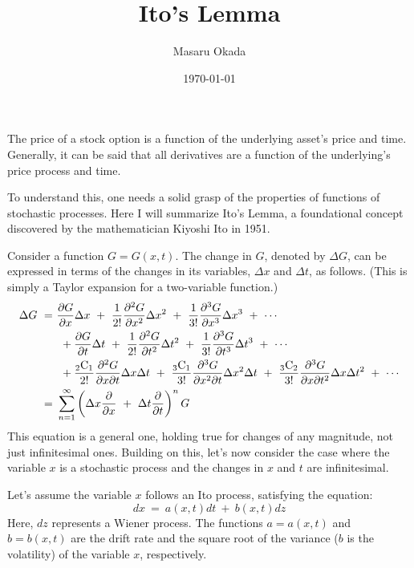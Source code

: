 \documentclass[uplatex,a4j,12pt,dvipdfmx]{jsarticle}
\title{Ito's Lemma}
\author{Masaru Okada}
\date{\today}
\begin{document}
\maketitle

The price of a stock option is a function of the underlying asset's price and time. Generally, it can be said that all derivatives are a function of the underlying's price process and time.

To understand this, one needs a solid grasp of the properties of functions of stochastic processes. Here I will summarize Ito's Lemma, a foundational concept discovered by the mathematician Kiyoshi Ito in 1951.

Consider a function $G=G(x,t)$. The change in $G$, denoted by $\Delta G$, can be expressed in terms of the changes in its variables, $\Delta x$ and $\Delta t$, as follows. (This is simply a Taylor expansion for a two-variable function.)
\begin{align}
	\Delta G
	\ = & \
	\dfrac{\partial G}{\partial x} \Delta x
	\ + \
	\dfrac{1}{2!} \dfrac{\partial^{2} G}{\partial x^{2}} \Delta x^{2}
	\ + \
	\dfrac{1}{3!} \dfrac{\partial^{3} G}{\partial x^{3}} \Delta x^{3}
	\ + \
	\cdots
	\\
	    & \ \ +
	\dfrac{\partial G}{\partial t} \Delta t
	\ + \
	\dfrac{1}{2!} \dfrac{\partial^{2} G}{\partial t^{2}} \Delta t^{2}
	\ + \
	\dfrac{1}{3!} \dfrac{\partial^{3} G}{\partial t^{3}} \Delta t^{3}
	\ + \
	\cdots
	\\
	    & \ \ +
	\dfrac{ {}_2 {\rm C}_{1} }{2!}
	\dfrac{\partial^{2} G}{\partial x \partial t } \Delta x \Delta t
	\ + \
	\dfrac{ {}_3 {\rm C}_{1} }{3!}
	\dfrac{\partial^{3} G}{\partial x^{2} \partial t } \Delta x^{2} \Delta t
	\ + \
	\dfrac{ {}_3 {\rm C}_{2} }{3!}
	\dfrac{\partial^{3} G}{\partial x \partial t^{2} } \Delta x \Delta t^{2}
	\ + \
	\cdots
	\\
	\ = & \
	\sum_{n=1}^{\infty}
	\left(
	\Delta x
	\dfrac{\partial}{\partial x}
	\ + \
	\Delta t
	\dfrac{\partial}{\partial t}
	\right)^{n}
	G
\end{align}
This equation is a general one, holding true for changes of any magnitude, not just infinitesimal ones. Building on this, let's now consider the case where the variable $x$ is a stochastic process and the changes in $x$ and $t$ are infinitesimal.

Let's assume the variable $x$ follows an Ito process, satisfying the equation:
$$
	dx
	\ = \
	a(x,t)dt
	\ + \
	b(x,t)dz
$$
Here, $dz$ represents a Wiener process. The functions $a=a(x,t)$ and $b=b(x,t)$ are the drift rate and the square root of the variance ($b$ is the volatility) of the variable $x$, respectively.
\end{document}
